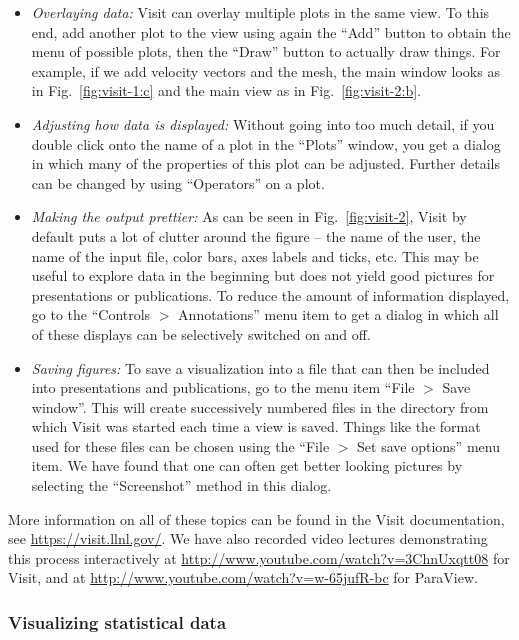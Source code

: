 \documentclass{article}
\begin{document}
\begin{itemize}
\item \textit{Overlaying data:} Visit can overlay multiple plots in the same
  view. To this end, add another plot to the view using again the ``Add''
  button to obtain the menu of possible plots, then the ``Draw'' button to
  actually draw things. For example, if we add velocity vectors and the mesh,
  the main window looks as in Fig.~\ref{fig:visit-1:c} and the main view as in
  Fig.~\ref{fig:visit-2:b}.

\item \textit{Adjusting how data is displayed:} Without going into too much
  detail, if you double click onto the name of a plot in the ``Plots'' window,
  you get a dialog in which many of the properties of this plot can be
  adjusted. Further details can be changed by using ``Operators'' on a plot.

\item \textit{Making the output prettier:} As can be seen in
  Fig.~\ref{fig:visit-2}, Visit by default puts a lot of clutter around the
  figure -- the name of the user, the name of the input file, color bars, axes
  labels and ticks, etc. This may be useful to explore data in the beginning
  but does not yield good pictures for presentations or publications. To
  reduce the amount of information displayed, go to the ``Controls $>$
  Annotations'' menu item to get a dialog in which all of these displays can
  be selectively switched on and off.

\item \textit{Saving figures:} To save a visualization into a file that can
  then be included into presentations and publications, go to the menu item
  ``File $>$ Save window''. This will create successively numbered files in
  the directory from which Visit was started each time a view is saved. Things
  like the format used for these files can be chosen using the ``File $>$ Set
  save options'' menu item. We have found that one can often get better
  looking pictures by selecting the ``Screenshot'' method in this dialog.
\end{itemize}

More information on all of these topics can be found in the Visit
documentation, see \url{https://visit.llnl.gov/}. We have also recorded
video lectures demonstrating this process interactively at
\url{http://www.youtube.com/watch?v=3ChnUxqtt08} for Visit, and at
\url{http://www.youtube.com/watch?v=w-65jufR-bc} for ParaView.


\subsubsection{Visualizing statistical data}
\label{sec:viz-stat}
\end{document}
